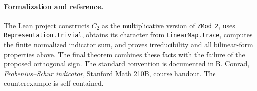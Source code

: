 \documentclass[11pt]{article}
\begin{document}
\paragraph{Formalization and reference.}
The Lean project constructs $C_2$ as the multiplicative version of
\texttt{ZMod 2}, uses \texttt{Representation.trivial}, obtains its character
from \texttt{LinearMap.trace}, computes the finite normalized indicator
sum, and proves irreducibility and all bilinear-form properties above.
The final theorem combines these facts with the failure of the proposed
orthogonal sign. The standard convention is documented in B. Conrad,
\emph{Frobenius--Schur indicator}, Stanford Math 210B,
\href{https://math.stanford.edu/~conrad/210BPage/handouts/realrep.pdf}{course handout}.
The counterexample is self-contained.
\end{document}
